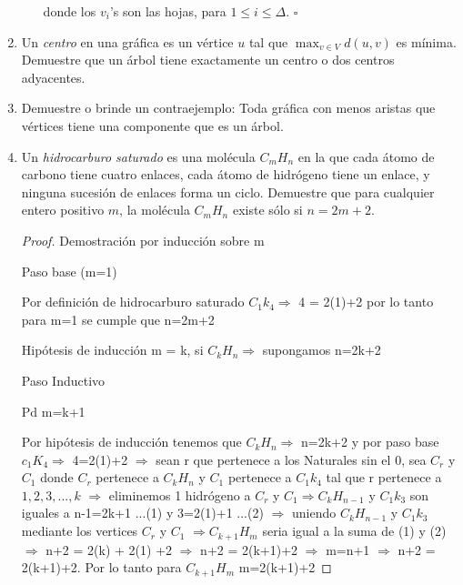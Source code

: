 \documentclass{article}
\begin{document}
\begin{enumerate}
\begin{enumerate}
      donde los $v_i$'s son las hojas, para $1 \leq i \leq \Delta$.
      \hfill $\square$
  \end{enumerate}
    
  \item Un {\em centro} en una gr\'afica es un v\'ertice
    $u$ tal que $\max_{v \in V} d(u, v)$ es m\'inima.
    Demuestre que un \'arbol tiene exactamente un centro
    o dos centros adyacentes.
    
  \item Demuestre o brinde un contraejemplo: Toda
    gr\'afica con menos aristas que v\'ertices tiene
    una componente que es un \'arbol.
    
  \item Un {\em hidrocarburo saturado} es una
    mol\'ecula $C_mH_n$ en la que cada \'atomo de
    carbono tiene cuatro enlaces, cada
    \'atomo de hidr\'ogeno tiene un enlace, y
    ninguna sucesi\'on de enlaces forma un ciclo.
    Demuestre que para cualquier entero positivo
    $m$, la mol\'ecula $C_mH_n$ existe s\'olo si
    $n = 2m + 2$.
    


    \begin{proof} Demostración por inducción sobre m

      Paso base (m=1)
      
      Por definición de hidrocarburo saturado $C_1 k_4 \Longrightarrow$  4 = 2(1)+2 por lo tanto para m=1 se cumple que n=2m+2
      
      Hipótesis de inducción m = k, si  $C_k H_n \Longrightarrow$ supongamos n=2k+2
      
      Paso Inductivo
      
      Pd m=k+1
      
      Por hipótesis de inducción tenemos que $C_k H_n \Longrightarrow$ n=2k+2 y por paso base $c_1 K_4 \Longrightarrow$ 4=2(1)+2 $\Longrightarrow$ sean r que pertenece a los Naturales sin el 0, sea $C_r$ y $C_1$ donde  $C_r$ pertenece a $C_k H_n$  y $C_1$ pertenece a $C_1 k_4$ tal que r pertenece a ${1,2,3,...,k}$  $\Longrightarrow$  eliminemos 1 hidrógeno a $C_r$ y $C_1 \Longrightarrow C_k H_{n-1}$ y $C_1 k_3$ son iguales a n-1=2k+1 ...(1) y 3=2(1)+1 ...(2) $\Longrightarrow$ uniendo $C_k H_{n-1}$ y $C_1 k_3$ mediante los vertices $C_r$ y $C_1$ $\Longrightarrow C_{k+1} H_{m}$ seria igual a la suma de (1) y (2) $\Longrightarrow$ n+2 = 2(k) + 2(1) +2 $\Longrightarrow$  n+2 = 2(k+1)+2
      $\Longrightarrow$ m=n+1 $\Longrightarrow$  n+2 = 2(k+1)+2. Por lo tanto para $C_{k+1} H_{m}$ m=2(k+1)+2
      

\end{proof}
\end{enumerate}
\end{document}
